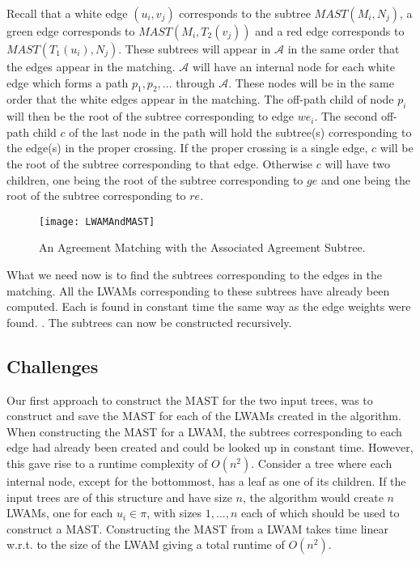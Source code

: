 Recall that a white edge $(u_i, v_j)$ corresponds to the subtree $MAST(M_i,N_j)$, a green edge corresponds to $MAST(M_i,T_2(v_j))$ and a red edge corresponds to $MAST(T_1(u_i),N_j)$. These subtrees will appear in $\mathcal{A}$ in the same order that the edges appear in the matching. $\mathcal{A}$ will have an internal node for each white edge which forms a path ${p_1, p_2, ...}$ through $\mathcal{A}$. These nodes will be in the same order that the white edges appear in the matching. The off-path child of node $p_i$ will then be the root of the subtree corresponding to edge $we_i$. The second off-path child $c$ of the last node in the path will hold the subtree(s) corresponding to the edge(s) in the proper crossing. If the proper crossing is a single edge, $c$ will be the root of the subtree corresponding to that edge. Otherwise $c$ will have two children, one being the root of the subtree corresponding to $ge$ and one being the root of the subtree corresponding to $re$.

\begin{figure}
	\label{lwam_mast_figure}
	\texttt{[image: LWAMAndMAST]}
	\caption{An Agreement Matching with the Associated Agreement Subtree. \cite{nlogn}}
\end{figure}

What we need now is to find the subtrees corresponding to the edges in the matching. All the LWAMs corresponding to these subtrees have already been computed. Each is found in constant time the same way as the edge weights were found.  . The subtrees can now be constructed recursively.

\subsection{Challenges} 
Our first approach to construct the MAST for the two input trees, was to construct and save the MAST for each of the LWAMs created in the algorithm. When constructing the MAST for a LWAM, the subtrees corresponding to each edge had already been created and could be looked up in constant time. However, this gave rise to a runtime complexity of $O(n^2)$. Consider a tree where each internal node, except for the bottommost, has a leaf as one of its children. If the input trees are of this structure and have size $n$, the algorithm would create $n$ LWAMs, one for each $u_i \in \pi$, with sizes $1, ..., n$ each of which should be used to construct a MAST. Constructing the MAST from a LWAM takes time linear w.r.t. to the size of the LWAM giving a total runtime of $O(n^2)$.

